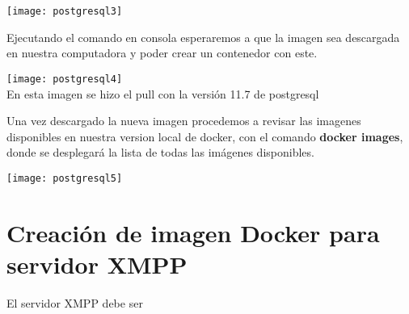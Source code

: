 \documentclass[10pt,letterpaper]{article}
\begin{document}
\begin{center}
\centering
\texttt{[image: postgresql3]}
\end{center}

Ejecutando el comando en consola esperaremos a que la imagen sea descargada en nuestra computadora y poder crear un contenedor con este.

\begin{center}
\texttt{[image: postgresql4]}\\
En esta imagen se hizo el pull con la versión 11.7 de postgresql
\end{center}

Una vez descargado la nueva imagen procedemos a revisar las imagenes disponibles en nuestra version local de docker, con el comando \textbf{docker images}, donde se desplegará la lista de todas las imágenes disponibles.

\begin{center}
\texttt{[image: postgresql5]}
\end{center}

\clearpage
\section{Creación de imagen Docker para servidor XMPP}

El servidor XMPP debe ser 
\end{document}
